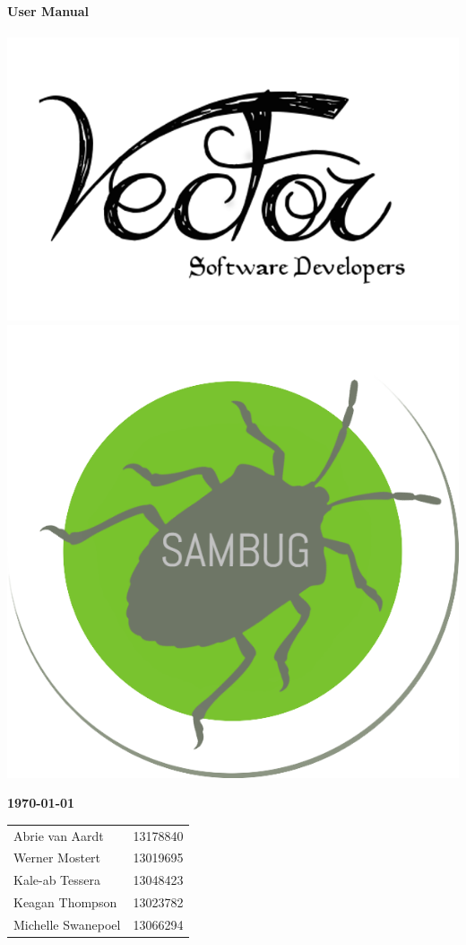 \documentclass[11pt,a4paper,titlepage]{article}
\begin{document}
\begin{titlepage}
    \vspace*{-0.5cm}
	  \huge \textbf {User Manual}\\
	  \hfill\\
	\vspace*{-0.5cm}  
      \includegraphics[scale=0.2]{logo}\hfill
	\includegraphics[scale=0.2]{sambug_logo}
         
    \vskip2cm
          
    \large \textbf{\monthyeardate\today}
  
    \vfill
\begin{tabular}{lr}
        	Abrie van Aardt&13178840\\
		Werner Mostert&13019695\\
		Kale-ab Tessera&13048423\\
		Keagan Thompson&13023782\\
		Michelle Swanepoel&13066294\\
	\end{tabular}
\end{titlepage}
	
\end{document}
